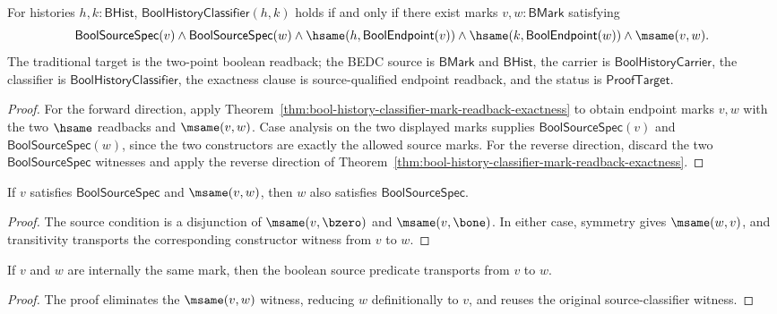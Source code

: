 \begin{theorem}
\label{thm:bool-source-qualified-classifier-readback-exactness}
For histories $h,k:\mathsf{BHist}$,
$\mathsf{BoolHistoryClassifier}(h,k)$ holds if and only if there exist marks
$v,w:\mathsf{BMark}$ satisfying
$$
  \mathsf{BoolSourceSpec}(v)
  \land
  \mathsf{BoolSourceSpec}(w)
  \land
  \hsame(h,\mathsf{BoolEndpoint}(v))
  \land
  \hsame(k,\mathsf{BoolEndpoint}(w))
  \land
  \msame(v,w).
$$
The traditional target is the two-point boolean readback; the BEDC source is
$\mathsf{BMark}$ and $\mathsf{BHist}$, the carrier is
$\mathsf{BoolHistoryCarrier}$, the classifier is
$\mathsf{BoolHistoryClassifier}$, the exactness clause is source-qualified
endpoint readback, and the status is $\mathsf{ProofTarget}$.
\end{theorem}
\begin{proof}
For the forward direction, apply
Theorem~\ref{thm:bool-history-classifier-mark-readback-exactness} to obtain
endpoint marks $v,w$ with the two $\hsame$ readbacks and $\msame(v,w)$. Case
analysis on the two displayed marks supplies $\mathsf{BoolSourceSpec}(v)$ and
$\mathsf{BoolSourceSpec}(w)$, since the two constructors are exactly the
allowed source marks. For the reverse direction, discard the two
$\mathsf{BoolSourceSpec}$ witnesses and apply the reverse direction of
Theorem~\ref{thm:bool-history-classifier-mark-readback-exactness}.
\end{proof}

\begin{theorem}
\label{thm:bool-source-spec-respects-msame}
If \(v\) satisfies \(\mathsf{BoolSourceSpec}\) and \(\msame(v,w)\), then \(w\) also satisfies \(\mathsf{BoolSourceSpec}\).
\end{theorem}
\begin{proof}
The source condition is a disjunction of \(\msame(v,\bzero)\) and \(\msame(v,\bone)\). In either case, symmetry gives \(\msame(w,v)\), and transitivity transports the corresponding constructor witness from \(v\) to \(w\).
\end{proof}

\begin{theorem}
\label{prop:bool-source-msame-transport}
If \(v\) and \(w\) are internally the same mark, then the boolean source predicate transports from \(v\) to \(w\).
\end{theorem}
\begin{proof}
The proof eliminates the \(\msame(v,w)\) witness, reducing \(w\) definitionally to \(v\), and reuses the original source-classifier witness.
\end{proof}

